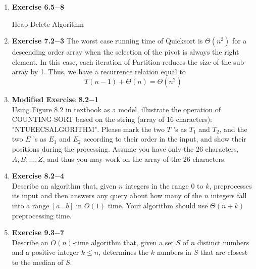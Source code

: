 \documentclass[a4paper,11pt,oneside]{book}
\begin{document}
\noindent{}
\normalsize

\begin{enumerate}
  \item {\textbf{Exercise 6.5$-$8}} 
  \begin{algorithm}
    \caption{Heap-Delete Algorithm}
    \begin{algorithmic}[1]
        \Statex
        \EndFunction
    \end{algorithmic}
\end{algorithm}

  \item {\textbf{Exercise 7.2$-$3}}
  The worst case running time of Quicksort is $\Theta\left(n^2\right)$ for a descending order array when the selection of the pivot is always the right element. 
  In this case, each iteration of Partition reduces the size of the sub-array by 1. Thus, we have a recurrence relation equal to 
  \[T(n-1)+\Theta(n) = \Theta(n^2)\]

  \item {\textbf{Modified Exercise 8.2$-$1}}
  \\
  Using Figure 8.2 in textbook as a model, illustrate the operation of COUNTING-SORT based on the string (array of 16 characters): "NTUEECSALGORITHM". Please mark the two $T$ 's as $T_1$ and $T_2$, and the two $E$ 's as $E_1$ and $E_2$ according to their order in the input, and show their positions during the processing. Assume you have only the 26 characters, $A, B, \ldots, Z$, and thus you may work on the array of the 26 characters.
  
  \item {\textbf{Exercise 8.2$-$4}}
  \\ 
  Describe an algorithm that, given $n$ integers in the range 0 to $k$, preprocesses its input and then answers any query about how many of the $n$ integers fall into a range $[a \ldots b]$ in $O(1)$ time. Your algorithm should use $\Theta(n+k)$ preprocessing time.
  
  \item {\textbf{Exercise 9.3$-$7}}
  \\
  Describe an $O(n)$-time algorithm that, given a set $S$ of $n$ distinct numbers and a positive integer $k \leq n$, determines the $k$ numbers in $S$ that are closest to the median of $S$.
  

\end{enumerate}
\end{document}
